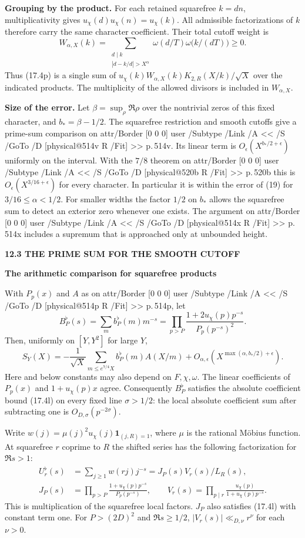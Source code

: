 \documentclass[11pt,letterpaper]{article}
\makeatletter
\newcommand{\rightmarktext}{}
\newcommand{\printfolio}{}
\newcommand{\leaf}[4]{\clearpage\gdef\printfolio{#1}\gdef\rightmarktext{#2}%
  {\small\sffamily\bfseries\color{ink}#3\par}\vspace{3pt}%
  {\LARGE\bfseries #4\par}\vspace{5pt}}
\newcommand{\point}[1]{\par\smallskip\textbf{#1.}\enspace\ignorespaces}
\newcommand{\MusicPDFPageRef}[1]{\pdfpageref\csname physical@#1\endcsname\space\space 0 R}
\newcommand{\pagelink}[2]{\leavevmode\pdfstartlink attr{/Border [0 0 0]} user{%
  /Subtype /Link /A << /S /GoTo /D [\MusicPDFPageRef{#1} /Fit] >>}%
  {\color{ink}#2}\pdfendlink}
\newcommand{\pg}[1]{\pagelink{#1}{p.\,#1}}
\makeatother
\begin{document}
\point{Grouping by the product}
For each retained squarefree $k=dn$, multiplicativity gives
$u_\chi(d)u_\chi(n)=u_\chi(k)$. All admissible factorizations of $k$
therefore carry the same character coefficient. Their total cutoff weight is
\[
 W_{\alpha,X}(k)=\sum_{\substack{d\mid k\\|d-k/d|>X^\alpha}}
               \omega(d/T)\omega\big(k/(dT)\big)\ge0 .
\]
Thus (17.4p) is a single sum of $u_\chi(k)W_{\alpha,X}(k)
K_{2,R}(X/k)/\sqrt X$ over the indicated products. The multiplicity
of the allowed divisors is included in $W_{\alpha,X}$.

\point{Size of the error}
Let $\beta=\sup_\rho\Re\rho$ over the nontrivial zeros of this fixed
character, and $b_*=\beta-1/2$. The squarefree restriction and smooth
cutoffs give a prime-sum comparison on \pg{514v}. Its linear term is
$O_\epsilon(X^{b_*/2+\epsilon})$ uniformly on the interval.
With the $7/8$ theorem on \pg{520b} this is $O_\epsilon(X^{3/16+\epsilon})$
for every character. In particular it is within the error of (19)
for $3/16\le\alpha<1/2$. For smaller widths the factor $1/2$ on
$b_*$ allows the squarefree sum to detect an exterior zero whenever
one exists. The argument on \pg{514x} includes a supremum that is
approached only at unbounded height.

\leaf{514v}{The squarefree Euler factors}{12.3 \quad THE PRIME SUM FOR THE SMOOTH CUTOFF}{The arithmetic comparison for squarefree products}
With $P_p(x)$ and $A$ as on \pg{514p}, let
\[
 B_P^\flat(s)=\sum_m b_P^\flat(m)m^{-s}
       =\prod_{p>P}\frac{1+2u_\chi(p)p^{-s}}{P_p(p^{-s})^2}.
\]
Then, uniformly on $[Y,Y^2]$ for large $Y$,
\[
 S_Y(X)=-\frac1{\sqrt X}\sum_{m\le e^{7/4}X} b_P^\flat(m) A(X/m)
                 +O_{\alpha,\epsilon}(X^{\max(\alpha,b_*/2)+\epsilon}).
 \tag{17.4q}
\]
Here and below constants may also depend on $F,\chi,\omega$. The
linear coefficients of $P_p(x)$ and $1+u_\chi(p)x$ agree.
Consequently $B_P^\flat$ satisfies the absolute coefficient bound
(17.4l) on every fixed line $\sigma>1/2$: the local absolute
coefficient sum after subtracting one is $O_{D,\sigma}(p^{-2\sigma})$.

Write $w(j)=\mu(j)^2u_\chi(j)\mathbf1_{(j,R)=1}$, where $\mu$ is
the rational M\"obius function. At squarefree $r$ coprime to $R$ the
shifted series has the following factorization for $\Re s>1$:
\begin{align*}
 U_r^\flat(s)&=\sum_{j\ge1}w(rj)j^{-s}
                  =J_P(s)V_r(s)/L_R(s),\\
 J_P(s)&=\prod_{p>P}\frac{1+u_\chi(p)p^{-s}}{P_p(p^{-s})},\qquad
 V_r(s)=\prod_{p\mid r}\frac{u_\chi(p)}{1+u_\chi(p)p^{-s}} .
\end{align*}
This is multiplication of the squarefree local factors. $J_P$ also
satisfies (17.4l) with constant term one. For $P>(2D)^2$ and
$\Re s\ge1/2$, $|V_r(s)|\ll_{D,\nu}r^\nu$ for each $\nu>0$.
\end{document}
